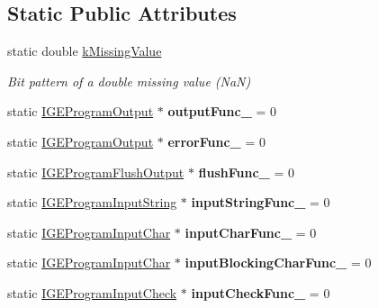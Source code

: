 \subsection*{Static Public Attributes}
\begin{DoxyCompactItemize}
\item 
\hypertarget{class_g_a_u_s_s_a645d2d3ccc29cbb4c8d9814841fea8c5}{static double \hyperlink{class_g_a_u_s_s_a645d2d3ccc29cbb4c8d9814841fea8c5}{k\-Missing\-Value}}\label{class_g_a_u_s_s_a645d2d3ccc29cbb4c8d9814841fea8c5}

\begin{DoxyCompactList}\small\item\em Bit pattern of a double missing value (Na\-N) \end{DoxyCompactList}\item 
\hypertarget{class_g_a_u_s_s_a3b7a032d5992b6f9d8cda17a17749092}{static \hyperlink{class_i_g_e_program_output}{I\-G\-E\-Program\-Output} $\ast$ {\bfseries output\-Func\-\_\-} = 0}\label{class_g_a_u_s_s_a3b7a032d5992b6f9d8cda17a17749092}

\item 
\hypertarget{class_g_a_u_s_s_acfc5b5f571e53b084bd6811b67e635d0}{static \hyperlink{class_i_g_e_program_output}{I\-G\-E\-Program\-Output} $\ast$ {\bfseries error\-Func\-\_\-} = 0}\label{class_g_a_u_s_s_acfc5b5f571e53b084bd6811b67e635d0}

\item 
\hypertarget{class_g_a_u_s_s_ab63ab560d4f88461fc3fa024816abc86}{static \hyperlink{class_i_g_e_program_flush_output}{I\-G\-E\-Program\-Flush\-Output} $\ast$ {\bfseries flush\-Func\-\_\-} = 0}\label{class_g_a_u_s_s_ab63ab560d4f88461fc3fa024816abc86}

\item 
\hypertarget{class_g_a_u_s_s_acc4c2c7f32eaae3ca224f507869fa647}{static \hyperlink{class_i_g_e_program_input_string}{I\-G\-E\-Program\-Input\-String} $\ast$ {\bfseries input\-String\-Func\-\_\-} = 0}\label{class_g_a_u_s_s_acc4c2c7f32eaae3ca224f507869fa647}

\item 
\hypertarget{class_g_a_u_s_s_a75fbe4e1dc457ca6b652e2fde7162759}{static \hyperlink{class_i_g_e_program_input_char}{I\-G\-E\-Program\-Input\-Char} $\ast$ {\bfseries input\-Char\-Func\-\_\-} = 0}\label{class_g_a_u_s_s_a75fbe4e1dc457ca6b652e2fde7162759}

\item 
\hypertarget{class_g_a_u_s_s_aba7aaee23285ecc00ccab1124dfa9fb1}{static \hyperlink{class_i_g_e_program_input_char}{I\-G\-E\-Program\-Input\-Char} $\ast$ {\bfseries input\-Blocking\-Char\-Func\-\_\-} = 0}\label{class_g_a_u_s_s_aba7aaee23285ecc00ccab1124dfa9fb1}

\item 
\hypertarget{class_g_a_u_s_s_a7d0c957991dda3346a0ff6d063ab7e51}{static \hyperlink{class_i_g_e_program_input_check}{I\-G\-E\-Program\-Input\-Check} $\ast$ {\bfseries input\-Check\-Func\-\_\-} = 0}\label{class_g_a_u_s_s_a7d0c957991dda3346a0ff6d063ab7e51}

\end{DoxyCompactItemize}



